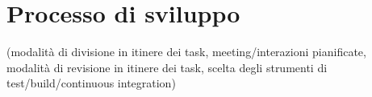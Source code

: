 \section{Processo di sviluppo}

(modalità di divisione in itinere dei task, meeting/interazioni pianificate, modalità di revisione in itinere dei task, scelta degli strumenti di test/build/continuous integration)
